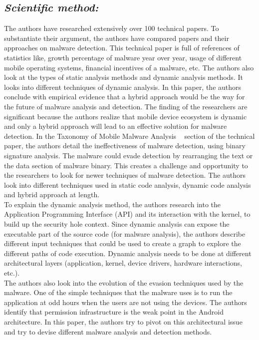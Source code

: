 \documentclass[letterpaper,10pt]{texMemo}
\begin{document}
\subsection*{\textit{Scientific method:}}
The authors have researched extensively over 100 technical papers. To substantiate their argument, the authors have compared papers and their approaches on malware detection. This technical paper is full of references of statistics like, growth percentage of malware year over year, usage of different mobile operating systems, financial incentives of a malware, etc. The authors also look at the types of static analysis methods and dynamic analysis methods. It looks into different techniques of dynamic analysis. In this paper, the authors conclude with empirical evidence that a hybrid approach would be the way for the future of malware analysis and detection. The finding of the researchers are significant because the authors realize that mobile device ecosystem is dynamic and only a hybrid approach will lead to an effective solution for malware detection.
In the Taxonomy of Mobile Malware Analysis ~\cite{Tam:2017:EAM:3022634.3017427} section of the technical paper, the authors detail the ineffectiveness of malware detection, using binary signature analysis. The malware could evade detection by rearranging the text or the data section of malware binary. This creates a challenge and opportunity to the researchers to look for newer techniques of malware detection. The authors look into different techniques used in static code analysis, dynamic code analysis and hybrid approach at length.\\
To explain the dynamic analysis method, the authors research into the Application Programming Interface (API) and its interaction with the kernel, to build up the security hole context. Since dynamic analysis can expose the executable part of the source code (for malware analysis), the authors describe different input techniques that could be used to create a graph to explore the different paths of code execution. Dynamic analysis needs to be done at different architectural layers (application, kernel, device drivers, hardware interactions, etc.).\\
The authors also look into the evolution of the evasion techniques used by the malware. One of the simple techniques that the malware uses is to run the application at odd hours when the users are not using the devices. The authors identify that permission infrastructure is the weak point in the Android architecture. In this paper, the authors try to pivot on this architectural issue and try to devise different malware analysis and detection methods.
\end{document}
